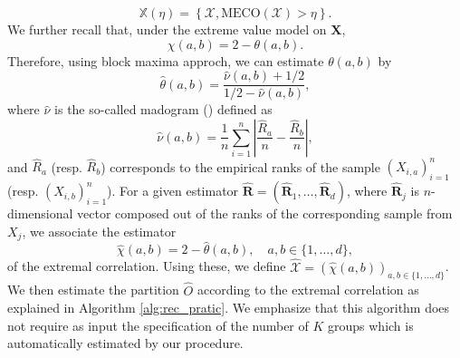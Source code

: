 \documentclass[11pt]{article}
\newcommand{\MECO}{\mathrm{MECO}}
\theoremstyle{definition}
\begin{document}
	\begin{equation*}
		\mathbb{X}(\eta) = \left\{ \mathcal{X}, \MECO(\mathcal{X}) > \eta \right\}.
	\end{equation*}
	We further recall that, under the extreme value model on $\textbf{X}$,
	\begin{equation}
		\chi(a,b) = 2 - \theta(a,b).
	\end{equation}
	Therefore, using block maxima approch, we can estimate $\theta(a,b)$ by 
	\begin{equation*}
		\hat{\theta}(a,b) = \frac{\hat{\nu}(a,b) + 1/2}{1/2 - \hat{\nu}(a,b)},
	\end{equation*}
	where $\hat{\nu}$ is the so-called madogram (\cite{cooley2006variograms}) defined as
	\begin{equation*}
		\hat{\nu}(a,b) = \frac{1}{n} \sum_{i=1}^n \left| \frac{\hat{R}_a}{n} - \frac{\hat{R}_b}{n} \right|,
	\end{equation*}
	and $\hat{R}_a$ (resp. $\hat{R}_b$) corresponds to the empirical ranks of the sample $(X_{i,a})_{i=1}^n$ (resp. $(X_{i,b})_{i=1}^n$). For a given estimator $\hat{\textbf{R}} = (\hat{\textbf{R}}_1, \dots, \hat{\textbf{R}}_d)$, where $\hat{\textbf{R}}_j$ is $n$-dimensional vector composed out of the ranks of the corresponding sample from $X_j$, we associate the estimator
	\begin{equation*}
		\hat{\chi}(a,b) = 2 - \hat{\theta}(a,b), \quad  a,b \in \{1,\dots, d\},
	\end{equation*}
	of the extremal correlation. Using these, we define $\hat{\mathcal{X}} = (\hat{\chi}(a,b))_{a,b \in \{1,\dots,d\}}$. We then estimate the partition $\hat{O}$ according to the extremal correlation as explained in Algorithm \ref{alg:rec_pratic}. We emphasize that this algorithm does not require as input the specification of the number of $K$ groups which is automatically estimated by our procedure.
	
\end{document}
